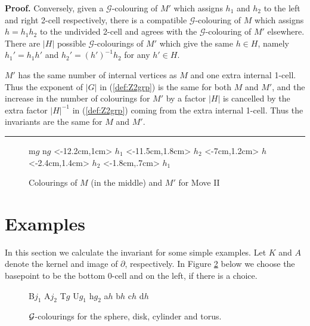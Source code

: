 \documentclass[a4paper,11pt]{article}
\newenvironment{Proof}[1][Proof]{\textbf{#1.} }{\ \rule{0.5em}{0.5em}}
\def \G {\mathcal{G}}
\begin{document}
\begin{Proof}
Conversely, given a $\G$-colouring of $M'$ which assigns $h_1$ and $h_2$ to the left and right 2-cell respectively, there is a compatible $\G$-colouring of $M$ which assigns $h=h_1h_2$ to the undivided 2-cell and agrees with the $\G$-colouring of $M'$ elsewhere. There are $|H|$ possible $\G$-colourings of $M'$ which give the same $h\in H$, namely $h_1'=h_1h'$ and $h_2'=(h')^{-1}h_2$ for any $h'\in H$.

$M'$ has the same number of internal vertices as $M$ and one extra internal 1-cell. Thus the exponent of $|G|$ in (\ref{def:Z2grp}) is the same for both $M$ and $M'$, and the increase in the number of colourings for $M'$ by a factor $|H|$ is cancelled by the extra factor $|H|^{-1}$ in (\ref{def:Z2grp}) coming from the extra internal 1-cell. Thus the invariants are the same for $M$ and $M'$.
\end{Proof}

\begin{figure}[htbp] 
\centerline{\relabelbox 
\epsfxsize 11.5cm
\adjustrelabel <1pt,-8pt> {m}{$g$}
\adjustrelabel <-3pt,-1pt> {n}{$g$}
\extralabel <-12.2cm,1cm> {$h_1$}
\extralabel <-11.5cm,1.8cm> {$h_2$}
\extralabel <-7cm,1.2cm> {$h$}
\extralabel <-2.4cm,1.4cm> {$h_2$}
\extralabel <-1.8cm,.7cm> {$h_1$}
\endrelabelbox}
\caption{Colourings of $M$ (in the middle) and $M'$ for Move II}
\label{fig:pfmv2}
\end{figure}



\vskip 0.3cm

\section{Examples}
\label{sec:exp}


In this section we calculate the invariant for some simple examples.  Let $K$ and $A$ denote the kernel and image of $\partial$, respectively. In Figure \ref{fig:inv-exp1} below we choose the basepoint to be the bottom 0-cell and on the left, if there is a choice. 

\begin{figure}[htbp] 
\centerline{\relabelbox 
\epsfysize 2.8cm
\adjustrelabel <-3pt,1pt> {B}{$j_1$}
\adjustrelabel <-2pt,0pt> {A}{$j_2$}
\adjustrelabel <0pt,3pt> {T}{$g$}
\adjustrelabel <0pt,2pt> {U}{$g_1$}
\adjustrelabel <0pt,1pt> {h}{$g_2$}
\adjustrelabel <0pt,-1pt> {a}{$h$}
\adjustrelabel <-2pt,-3pt> {b}{$h$}
\adjustrelabel <-1pt,0pt> {c}{$h$}
\adjustrelabel <-2pt,0pt> {d}{$h$}
\endrelabelbox}
\caption{\label{fig:inv-exp1} $\cal G$-colourings for the sphere, disk, cylinder and torus. }
\end{figure}
\end{document}
